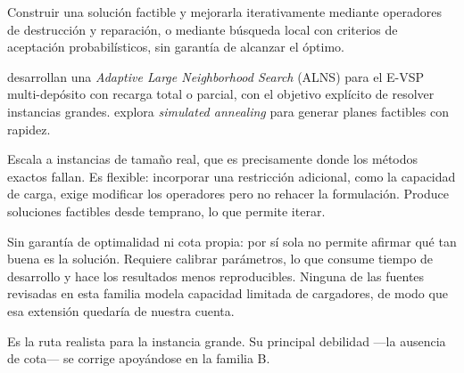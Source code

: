 \documentclass[11pt,a4paper,parskip=half]{scrartcl}
\begin{document}
\begin{campos}
\item[En qué consiste] Construir una solución factible y mejorarla iterativamente mediante operadores de destrucción y reparación, o mediante búsqueda local con criterios de aceptación probabilísticos, sin garantía de alcanzar el óptimo.
\item[Evidencia] \citet{wen_alnsevsp_2016} desarrollan una \textit{Adaptive Large Neighborhood Search} (ALNS) para el E-VSP multi-depósito con recarga total o parcial, con el objetivo explícito de resolver instancias grandes. \citet{li_limitedenergy_2014} explora \textit{simulated annealing} para generar planes factibles con rapidez.
\item[Ventajas] Escala a instancias de tamaño real, que es precisamente donde los métodos exactos fallan. Es flexible: incorporar una restricción adicional, como la capacidad de carga, exige modificar los operadores pero no rehacer la formulación. Produce soluciones factibles desde temprano, lo que permite iterar.
\item[Desventajas] Sin garantía de optimalidad ni cota propia: por sí sola no permite afirmar qué tan buena es la solución. Requiere calibrar parámetros, lo que consume tiempo de desarrollo y hace los resultados menos reproducibles. Ninguna de las fuentes revisadas en esta familia modela capacidad limitada de cargadores, de modo que esa extensión quedaría de nuestra cuenta.
\item[Aplicabilidad] Es la ruta realista para la instancia grande. Su principal debilidad —la ausencia de cota— se corrige apoyándose en la familia B.
\end{campos}
\end{document}

